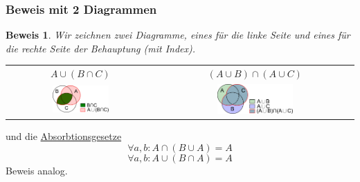 \documentclass{report}
\newtheorem{myproof}{Beweis}
\begin{document}
\subsubsection{Beweis mit 2 Diagrammen}
\begin{myproof}Wir zeichnen zwei Diagramme, eines für die linke Seite und eines für die rechte Seite der Behauptung (mit Index).
\begin{center}
\begin{tabular}{c c}
$A \cup (B \cap C)$ & $(A \cup B) \cap (A \cup C)$\\
\includegraphics[width=0.4\textwidth]{img/Aunion_BintersectC.pdf} & \includegraphics[width=0.4\textwidth]{img/AunionB_intersect_AunionC.pdf}
\end{tabular}
\end{center}
\end{myproof}
und die \underline{Absorbtionsgesetze}
\begin{equation}\forall a,b : A \cap (B \cup A) = A\end{equation}
\begin{equation}\forall a,b : A \cup (B \cap A) = A\end{equation}
Beweis analog.
\end{document}

